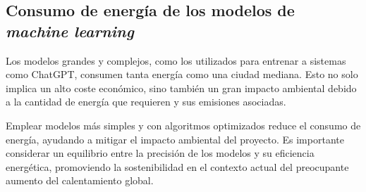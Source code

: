 \subsection{Consumo de energía de los modelos de \textit{machine learning}}
Los modelos grandes y complejos, como los utilizados para entrenar a sistemas como ChatGPT, consumen tanta energía como una ciudad mediana. Esto no solo implica un alto coste económico, sino también un gran impacto ambiental debido a la cantidad de energía que requieren y sus emisiones asociadas.

Emplear modelos más simples y con algoritmos optimizados reduce el consumo de energía, ayudando a mitigar el impacto ambiental del proyecto. Es importante considerar un equilibrio entre la precisión de los modelos y su eficiencia energética, promoviendo la sostenibilidad en el contexto actual del preocupante aumento del calentamiento global.